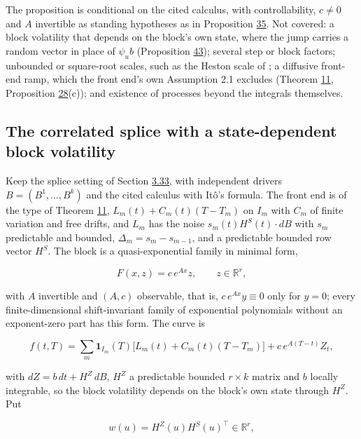 \documentclass[11pt]{article}
\begin{document}
The proposition is conditional on the cited calculus, with controllability, \(c\neq0\) and \(A\) invertible as standing hypotheses as in Proposition \hyperref[res:Proposition-35]{35}. Not covered: a block volatility that depends on the block's own state, where the jump carries a random vector in place of \(\psi_ub\) (Proposition \hyperref[res:Proposition-43]{43}); several step or block factors; unbounded or square-root scales, such as the Heston scale of \cite{brace2024sofr}; a diffusive front-end ramp, which the front end's own Assumption 2.1 excludes (Theorem \hyperref[res:Theorem-11]{11}, Proposition \hyperref[res:Proposition-28]{28}(c)); and existence of processes beyond the integrals themselves.

\subsection{The correlated splice with a state-dependent block volatility}\label{sec:3.37}

Keep the splice setting of Section \hyperref[sec:3.33]{3.33}, with independent drivers \(B=(B^1,\dots,B^k)\) and the cited calculus with Itô's formula. The front end is of the type of Theorem \hyperref[res:Theorem-11]{11}, \(L_m(t)+C_m(t)(T-T_m)\) on \(I_m\) with \(C_m\) of finite variation and free drifts, and \(L_m\) has the noise \(s_m(t)H^S(t)\cdot dB\) with \(s_m\) predictable and bounded, \(\Delta_m=s_m-s_{m-1}\), and a predictable bounded row vector \(H^S\). The block is a quasi-exponential family in minimal form,

\begin{equation*}
F(x,z)=c\,e^{Ax}z,\qquad z\in\mathbb R^r, \tag{3.169}\label{eq:3.169}
\end{equation*}

with \(A\) invertible and \((A,c)\) observable, that is, \(c\,e^{Ax}y\equiv0\) only for \(y=0\); every finite-dimensional shift-invariant family of exponential polynomials without an exponent-zero part has this form. The curve is

\begin{equation*}
f(t,T)=\sum_m\mathbf 1_{I_m}(T)\bigl[L_m(t)+C_m(t)(T-T_m)\bigr]+c\,e^{A(T-t)}Z_t, \tag{3.170}\label{eq:3.170}
\end{equation*}

with \(dZ=b\,dt+H^Z\,dB\), \(H^Z\) a predictable bounded \(r\times k\) matrix and \(b\) locally integrable, so the block volatility depends on the block's own state through \(H^Z\). Put

\begin{equation*}
w(u)=H^Z(u)H^S(u)^\top\in\mathbb R^r, \tag{3.171}\label{eq:3.171}
\end{equation*}
\end{document}

